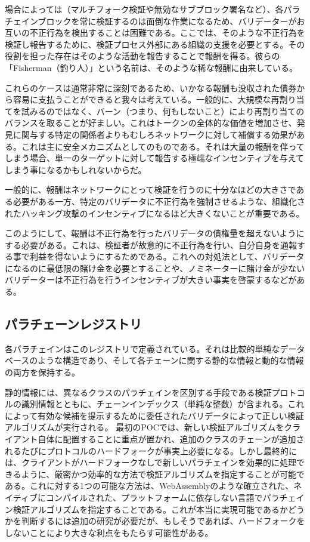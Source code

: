 場合によっては（マルチフォーク検証や無効なサブブロック署名など）、各パラチェインブロックを常に検証するのは面倒な作業になるため、バリデーターがお互いの不正行為を検出することは困難である。ここでは、そのような不正行為を検証し報告するために、検証プロセス外部にある組織の支援を必要とする。その役割を担った存在はそのような活動を報告することで報酬を得る。彼らの「Fisherman（釣り人）」という名前は、そのような稀な報酬に由来している。

これらのケースは通常非常に深刻であるため、いかなる報酬も没収された債券から容易に支払うことができると我々は考えている。一般的に、大規模な再割り当てを試みるのではなく、バーン（つまり、何もしないこと）により再割り当てのバランスを取ることが好ましい。これはトークンの全体的な価値を増加させ、発見に関与する特定の関係者よりもむしろネットワークに対して補償する効果がある。これは主に安全メカニズムとしてのものである。それは大量の報酬を伴ってしまう場合、単一のターゲットに対して報告する極端なインセンティブを与えてしまう事になるかもしれないからだ。

一般的に、報酬はネットワークにとって検証を行うのに十分なほどの大きさである必要がある一方、特定のバリデータに不正行為を強制させるような、組織化されたハッキング攻撃のインセンティブになるほど大きくないことが重要である。

このようにして、報酬は不正行為を行ったバリデータの債権量を超えないようにする必要がある。これは、検証者が故意的に不正行為を行い、自分自身を通報する事で利益を得ないようにするためである。これへの対処法として、バリデータになるのに最低限の賭け金を必要とすることや、ノミネーターに賭け金が少ないバリデーターは不正行為を行うインセンティブが大きい事実を啓蒙するなどがある。

\hypertarget{ux30d1ux30e9ux30c1ux30a7ux30fcux30f3ux30ecux30b8ux30b9ux30c8ux30ea}{%
\subsection{パラチェーンレジストリ}\label{ux30d1ux30e9ux30c1ux30a7ux30fcux30f3ux30ecux30b8ux30b9ux30c8ux30ea}}

各パラチェインはこのレジストリで定義されている。それは比較的単純なデータベースのような構造であり、そして各チェーンに関する静的な情報と動的な情報の両方を保持する。

静的情報には、異なるクラスのパラチェインを区別する手段である検証プロトコルの識別情報とともに、チェーンインデックス（単純な整数）が含まれる。これによって有効な候補を提示するために委任されたバリデータによって正しい検証アルゴリズムが実行される。
最初のPOCでは、新しい検証アルゴリズムをクライアント自体に配置することに重点が置かれ、追加のクラスのチェーンが追加されるたびにプロトコルのハードフォークが事実上必要になる。しかし最終的には、クライアントがハードフォークなしで新しいパラチェインを効果的に処理できるように、厳密かつ効率的な方法で検証アルゴリズムを指定することが可能である。これに対する1つの可能な方法は、WebAssemblyのような確立された、ネイティブにコンパイルされた、プラットフォームに依存しない言語でパラチェイン検証アルゴリズムを指定することである。これが本当に実現可能であるかどうかを判断するには追加の研究が必要だが、もしそうであれば、ハードフォークをしないことにより大きな利点をもたらす可能性がある。

